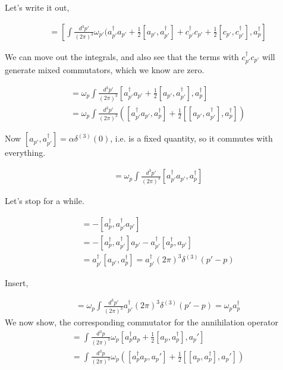 \documentclass[working, oneside]{../../Preambles/tuftebook}
\begin{document}
\begin{solution}
Let's write it out,

\begin{align*}
    [H, a_p^\dagger] &= \left[ \int \frac{d^3p'}{(2\pi)^3} \omega_{p'} (a_{p'}^\dagger a_{p'} + \frac{1}{2} [a_{p'}, a_{p'}^\dagger] + c_{p'}^\dagger c_{p'} + \frac{1}{2} [c_{p'}, c_{p'}^\dagger], a_p^\dagger \right]
\end{align*}

We can move out the integrals, and also see that the terms with \(c_{p'}^\dagger c_{p'}\) will generate mixed commutators, which we know are zero.

\begin{align*}
    &= \omega_p \int \frac{d^3p'}{(2\pi)^3} [a_{p'}^\dagger a_{p'} + \frac{1}{2} [a_{p'}, a_{p'}^\dagger], a_p^\dagger] \\
    &= \omega_p \int \frac{d^3p'}{(2\pi)^3} \left( [a_{p'}^\dagger a_{p'}, a_p^\dagger] + \frac{1}{2} [[a_{p'}, a_{p'}^\dagger], a_p^\dagger] \right)
\end{align*}

Now \( [a_{p'}, a_{p'}^\dagger] = \alpha \delta^{(3)}(0) \), i.e. is a fixed quantity, so it commutes with everything.

\begin{align*}
    &= \omega_p \int \frac{d^3p'}{(2\pi)^3} [a_{p'}^\dagger a_{p'}, a_p^\dagger]
\end{align*}

Let's stop for a while.

\begin{align*}
    [a_{p'}^\dagger a_{p'}, a_p^\dagger] &= -[a_p^\dagger, a_{p'}^\dagger a_{p'}] \\
    &= -[a_p^\dagger, a_{p'}^\dagger] a_{p'} - a_{p'}^\dagger [a_p^\dagger, a_{p'}] \\
    &= a_{p'}^\dagger [a_{p'}, a_p^\dagger] = a_{p'}^\dagger (2\pi)^3 \delta^{(3)}(p' - p)
\end{align*}

Insert,

\begin{align*}
    &= \omega_p \int \frac{d^3p'}{(2\pi)^3} a_{p'}^\dagger (2\pi)^3 \delta^{(3)}(p' - p) = \omega_p a_p^\dagger
\end{align*}
We now show, the corresponding commutator for the annihilation operator
\begin{align*}
    [H, a_p] &= \int \frac{d^3p}{(2\pi)^3} \omega_p [a_p^\dagger a_p + \frac{1}{2} [a_p, a_p^\dagger], a_p'] \\
    &= \int \frac{d^3p}{(2\pi)^3} \omega_p ([a_p^\dagger a_p, a_p'] + \frac{1}{2} [[a_p, a_p^\dagger], a_p'])
\end{align*}


\end{solution}
\end{document}

